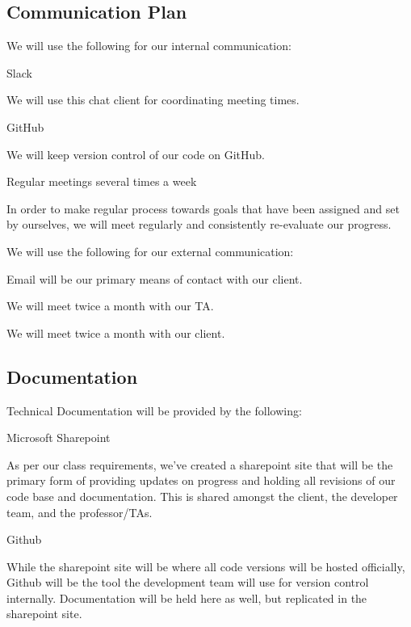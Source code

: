 \subsection{Communication Plan}
\par We will use the following for our internal communication:
\begin{list}{-}{}
\item Slack
\begin{list}{-}{}
\item We will use this chat client for coordinating meeting times.
\end{list}
\item GitHub
\begin{list}{-}{}
\item We will keep version control of our code on GitHub.
\end{list}
\item Regular meetings several times a week
\begin{list}{-}{}
\item In order to make regular process towards goals that have been assigned and set by ourselves, we will meet regularly and consistently re-evaluate our progress.
\end{list}
\end{list}

\par We will use the following for our external communication:
\begin{list}{-}{}
\item Email will be our primary means of contact with our client.
\item We will meet twice a month with our TA.
\item We will meet twice a month with our client.
\end{list}

\subsection{Documentation}
\par Technical Documentation will be provided by the following:
\begin{list}{-}{}
\item Microsoft Sharepoint
\begin{list}{-}{}
\item As per our class requirements, we’ve created a sharepoint site that will be the primary form of providing updates on progress and holding all revisions of our code base and documentation.
This is shared amongst the client, the developer team, and the professor/TAs.
\end{list}
\item Github
\begin{list}{-}{}
\item While the sharepoint site will be where all code versions will be hosted officially, Github will be the tool the development team will use for version control internally.
Documentation will be held here as well, but replicated in the sharepoint site.
\end{list}
\end{list}

